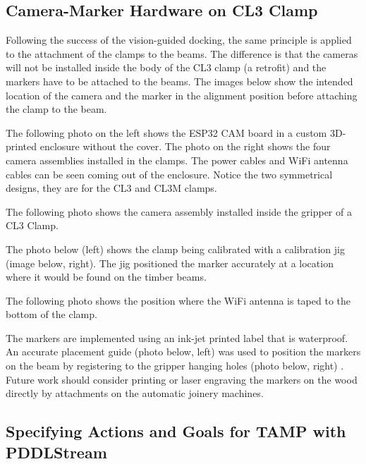 \subsection{Camera-Marker Hardware on CL3 Clamp}

Following the success of the vision-guided docking, the same principle is applied to the attachment of the clamps to the beams. The difference is that the cameras will not be installed inside the body of the CL3 clamp (a retrofit) and the markers have to be attached to the beams. The images below show the intended location of the camera and the marker in the alignment position before attaching the clamp to the beam.




The following photo on the left shows the ESP32 CAM board in a custom 3D-printed enclosure without the cover. The photo on the right shows the four camera assemblies installed in the clamps. The power cables and WiFi antenna cables can be seen coming out of the enclosure. Notice the two symmetrical designs, they are for the CL3 and CL3M clamps.




The following photo shows the camera assembly installed inside the gripper of a CL3 Clamp. 




The photo below (left) shows the clamp being calibrated with a calibration jig (image below, right). The jig positioned the marker accurately at a location where it would be found on the timber beams.




The following photo shows the position where the WiFi antenna is taped to the bottom of the clamp.




The markers are implemented using an ink-jet printed label that is waterproof. An accurate placement guide (photo below, left) was used to position the markers on the beam by registering to the gripper hanging holes (photo below, right) . Future work should consider printing or laser engraving the markers on the wood directly by attachments on the automatic joinery machines.




\subsection{Specifying Actions and Goals for TAMP with PDDLStream}

